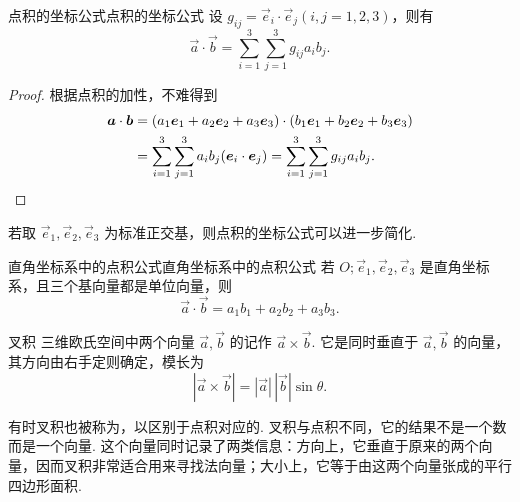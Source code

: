 \begin{theorem}{点积的坐标公式}{点积的坐标公式}
    设 $g_{ij} = \vec{e}_i \cdot \vec{e}_j (i,j = 1,2,3)$，则有
    \[
        \vec{a}\cdot\vec{b} = \sum_{i=1}^3 \sum_{j=1}^3 g_{ij} a_i b_j.
    \]
\end{theorem}

\begin{proof}
    根据点积的加性，不难得到
    \begin{align*}
        \vec{a}\cdot\vec{b}
         & = (a_1 \vec{e}_1 + a_2 \vec{e}_2 + a_3 \vec{e}_3)\cdot(b_1 \vec{e}_1 + b_2 \vec{e}_2 + b_3 \vec{e}_3) \\
         & = \sum_{i=1}^3 \sum_{j=1}^3 a_i b_j (\vec{e}_i \cdot \vec{e}_j)
        = \sum_{i=1}^3 \sum_{j=1}^3 g_{ij} a_i b_j. \qedhere
    \end{align*}
\end{proof}

若取 $\vec{e}_1, \vec{e}_2, \vec{e}_3$ 为标准正交基，则点积的坐标公式可以进一步简化.

\begin{corollary}{直角坐标系中的点积公式}{直角坐标系中的点积公式}
    若 $O;\vec{e}_1,\vec{e}_2,\vec{e}_3$ 是直角坐标系，且三个基向量都是单位向量，则
    \[
        \vec{a}\cdot\vec{b} = a_1 b_1 + a_2 b_2 + a_3 b_3.
    \]
\end{corollary}

\begin{definition}{叉积}{} 
    三维欧氏空间中两个向量 $\vec{a}, \vec{b}$ 的记作 $\vec{a}\times\vec{b}$. 它是同时垂直于 $\vec{a}, \vec{b}$ 的向量，其方向由右手定则确定，模长为
    \[
        |\vec{a}\times\vec{b}| = |\vec{a}|\,|\vec{b}| \sin \theta.
    \]
\end{definition}

有时叉积也被称为，以区别于点积对应的.
叉积与点积不同，它的结果不是一个数而是一个向量. 这个向量同时记录了两类信息：方向上，它垂直于原来的两个向量，因而叉积非常适合用来寻找法向量；大小上，它等于由这两个向量张成的平行四边形面积.


